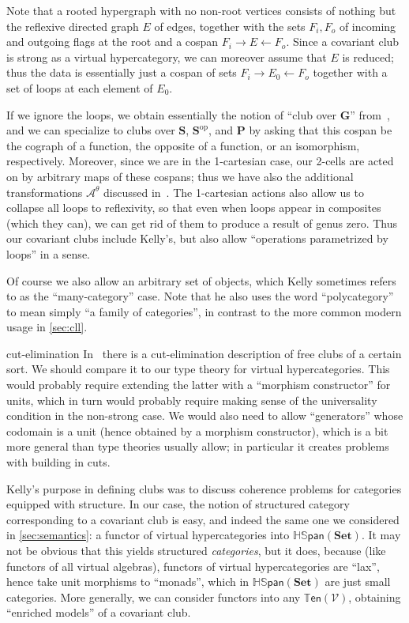 \documentclass{article}
\theoremstyle{definition}
\theoremstyle{remark}
\def\V{\mathscr{V}}
\def\ten{\mathbb{T}\mathsf{en}}
\def\hspan{\mathbb{HS}\mathsf{pan}}
\def\Set{\mathbf{Set}}
\def\op{^{\mathrm{op}}}
\let\ot\leftarrow
\begin{document}
Note that a rooted hypergraph with no non-root vertices consists of nothing but the reflexive directed graph $E$ of edges, together with the sets $F_i, F_o$ of incoming and outgoing flags at the root and a cospan $F_i \to E \ot F_o$.
Since a covariant club is strong as a virtual hypercategory, we can moreover assume that $E$ is reduced; thus the data is essentially just a cospan of sets $F_i \to E_0 \ot F_o$ together with a set of loops at each element of $E_0$.

If we ignore the loops, we obtain essentially the notion of ``club over $\mathbf{G}$'' from~\cite{kelly:mv-funct-calc,kelly:abst-coh}, and we can specialize to clubs over $\mathbf{S}$, $\mathbf{S}\op$, and $\mathbf{P}$ by asking that this cospan be the cograph of a function, the opposite of a function, or an isomorphism, respectively.
Moreover, since we are in the 1-cartesian case, our 2-cells are acted on by arbitrary maps of these cospans; thus we have also the additional transformations $\mathcal{A}^\theta$ discussed in~\cite[\S4.1]{kelly:mv-funct-calc}.
The 1-cartesian actions also allow us to collapse all loops to reflexivity, so that even when loops appear in composites (which they can), we can get rid of them to produce a result of genus zero.
Thus our covariant clubs include Kelly's, but also allow ``operations parametrized by loops'' in a sense.

Of course we also allow an arbitrary set of objects, which Kelly sometimes refers to as the ``many-category'' case.
Note that he also uses the word ``polycategory'' to mean simply ``a family of categories'', in contrast to the more common modern usage in \cref{sec:cll}.

\begin{anfxnote}{cut-elimination}
In~\cite{kelly:abst-coh} there is a cut-elimination description of free clubs of a certain sort.
We should compare it to our type theory for virtual hypercategories.
This would probably require extending the latter with a ``morphism constructor'' for units, which in turn would probably require making sense of the universality condition in the non-strong case.
We would also need to allow ``generators'' whose codomain is a unit (hence obtained by a morphism constructor), which is a bit more general than type theories usually allow; in particular it creates problems with building in cuts.
\end{anfxnote}

Kelly's purpose in defining clubs was to discuss coherence problems for categories equipped with structure.
In our case, the notion of structured category corresponding to a covariant club is easy, and indeed the same one we considered in \cref{sec:semantics}: a functor of virtual hypercategories into $\hspan(\Set)$.
It may not be obvious that this yields structured \emph{categories}, but it does, because (like functors of all virtual algebras), functors of virtual hypercategories are ``lax'', hence take unit morphisms to ``monads'', which in $\hspan(\Set)$ are just small categories.
More generally, we can consider functors into any $\ten(\V)$, obtaining ``enriched models'' of a covariant club.
\end{document}
